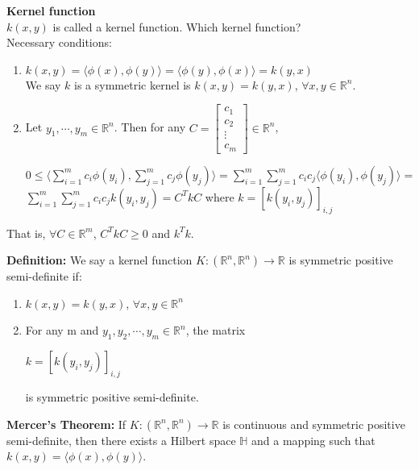 \documentclass{article}
\begin{document}
\pagebreak
\textbf{Kernel function} \\
$k(x,y)$ is called a kernel function. Which kernel function? \\
Necessary conditions:
\begin{enumerate}
    \item $k(x,y) = \langle \phi(x), \phi(y) \rangle = \langle \phi(y), \phi(x) \rangle = k(y,x)$ \\ We say $k$ is a symmetric kernel is $k(x,y) = k(y,x)$, $\forall x, y \in \mathbb{R}^{n}$.
    \item Let $y_1, \cdots, y_m \in \mathbb{R}^{n}$. Then for any $C = \begin{bmatrix} c_1 \\ c_2 \\ \vdots \\ c_m \end{bmatrix} \in \mathbb{R}^{n}$, 
    \begin{center}
        $0 \leq \langle \sum_{i=1}^{m} c_i \phi(y_i), \sum_{j=1}^{m} c_j \phi(y_j) \rangle = \sum_{i=1}^{m} \sum_{j=1}^{m} c_i c_j \langle \phi(y_i), \phi(y_j) \rangle = $\\ 
        $\sum_{i=1}^{m} \sum_{j=1}^{m} c_i c_j k(y_i, y_j) = C^TkC$ where $k = [k(y_i,y_j)]_{i,j}$  
    \end{center}
\end{enumerate}
That is, $\forall C \in \mathbb{R}^{m}$, $C^TkC \geq 0$ and $k^Tk$.
\bigbreak

\textbf{Definition:} We say a kernel function $K: (\mathbb{R}^n, \mathbb{R}^{n}) \to \mathbb{R}$ is symmetric positive semi-definite if:
\begin{enumerate}
    \item $k(x,y) = k(y,x)$, $\forall x,y \in \mathbb{R}^{n}$
    \item For any m and $y_1, y_2, \cdots, y_m \in \mathbb{R}^{n}$, the matrix 
    \begin{center}
        $k = [k(y_i, y_j)]_{i,j}$ 
    \end{center}
    is symmetric positive semi-definite.
    
\end{enumerate}

\textbf{Mercer's Theorem:} If $K: (\mathbb{R}^n, \mathbb{R}^{n}) \to \mathbb{R}$ is continuous and symmetric positive semi-definite, then there exists a Hilbert space $\mathbb{H}$ and a mapping such that $k(x,y) = \langle \phi(x), \phi(y) \rangle$.

\bigbreak
\end{document}
